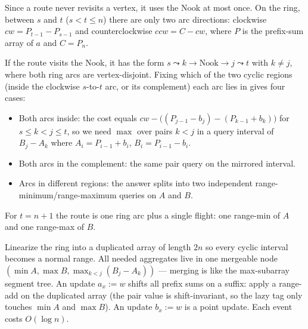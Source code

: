Since a route never revisits a vertex, it uses the Nook at most once. On the ring, between $s$ and $t$ ($s < t \le n$) there are only two arc directions: clockwise $cw = P_{t-1} - P_{s-1}$ and counterclockwise $ccw = C - cw$, where $P$ is the prefix-sum array of $a$ and $C = P_n$.

If the route visits the Nook, it has the form $s \leadsto k \to \text{Nook} \to j \leadsto t$ with $k \neq j$, where both ring arcs are vertex-disjoint. Fixing which of the two cyclic regions (inside the clockwise $s$-to-$t$ arc, or its complement) each arc lies in gives four cases:

\begin{itemize}
\item Both arcs inside: the cost equals $cw - \bigl((P_{j-1} - b_j) - (P_{k-1} + b_k)\bigr)$ for $s \le k < j \le t$, so we need $\max$ over pairs $k < j$ in a query interval of $B_j - A_k$ where $A_i = P_{i-1} + b_i$, $B_i = P_{i-1} - b_i$.
\item Both arcs in the complement: the same pair query on the mirrored interval.
\item Arcs in different regions: the answer splits into two independent range-minimum/range-maximum queries on $A$ and $B$.
\end{itemize}

For $t = n+1$ the route is one ring arc plus a single flight: one range-min of $A$ and one range-max of $B$.

Linearize the ring into a duplicated array of length $2n$ so every cyclic interval becomes a normal range. All needed aggregates live in one mergeable node $(\min A, \max B, \max_{k<j}(B_j - A_k))$ --- merging is like the max-subarray segment tree. An update $a_x := w$ shifts all prefix sums on a suffix: apply a range-add on the duplicated array (the pair value is shift-invariant, so the lazy tag only touches $\min A$ and $\max B$). An update $b_x := w$ is a point update. Each event costs $O(\log n)$.
